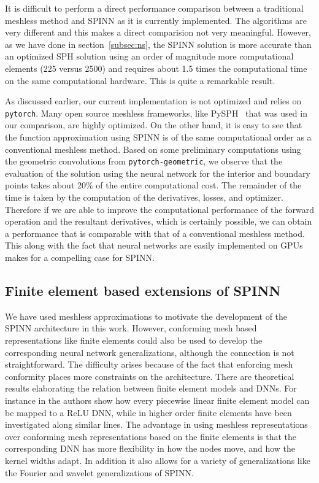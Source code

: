 \documentclass[12pt]{article}
\newcommand{\rb}[1]{#1}
\begin{document}
\rb{It is difficult to perform a direct performance comparison between a traditional meshless method and SPINN as it is currently implemented.  The algorithms are very different and this makes a direct comparision not very meaningful. However, as we have done in section~\ref{subsec:ns}, the SPINN solution is more accurate than an optimized SPH solution using an order of magnitude more computational elements (225 versus 2500) and requires about 1.5 times the computational time on the same computational hardware.  This is quite a remarkable result.

As discussed earlier, our current implementation is not optimized and relies on \texttt{pytorch}.  Many open source meshless frameworks, like PySPH~\cite{pysph2020} that was used in our comparison, are highly optimized.  On the other hand, it is easy to see that the function approximation using SPINN is of the same computational order as a conventional meshless method. Based on some preliminary computations using the geometric convolutions from \texttt{pytorch-geometric}, we observe that the evaluation of the solution using the neural network for the interior and boundary points takes about 20\% of the entire computational cost.  The remainder of the time is taken by the computation of the derivatives, losses, and optimizer.  Therefore if we are able to improve the computational performance of the forward operation and the resultant derivatives, which is certainly possible, we can obtain a performance that is comparable with that of a conventional meshless method. This along with the fact that neural networks are easily implemented on GPUs makes for a compelling case for SPINN.
}

\subsection{Finite element based extensions of SPINN}
We have used meshless approximations to motivate the development of the SPINN architecture in this work. However, conforming mesh based representations like finite elements could also be used to develop the corresponding neural network generalizations, although the connection is not straightforward. The difficulty arises because of the fact that enforcing mesh conformity places more constraints on the architecture. There are theoretical results elaborating the relation between finite element models and DNNs. For instance in \cite{HLXZ2020} the authors show how every piecewise linear finite element model can be mapped to a ReLU DNN, while in \cite{OPS19} higher order finite elements have been investigated along similar lines.  The advantage in using meshless representations over conforming mesh representations based on the finite elements is that the corresponding DNN has more flexibility in how the nodes move, and how the kernel widths adapt. In addition it also allows for a variety of generalizations like the Fourier and wavelet generalizations of SPINN.
\end{document}
